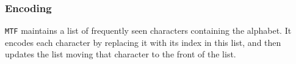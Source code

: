 \documentclass{article}
\begin{document}
\subsubsection{Encoding}
\texttt{MTF} maintains a list of frequently seen characters containing the alphabet. It encodes each character by replacing it with its index in this list, and then updates the list moving that character to the front of the list.
\end{document}
